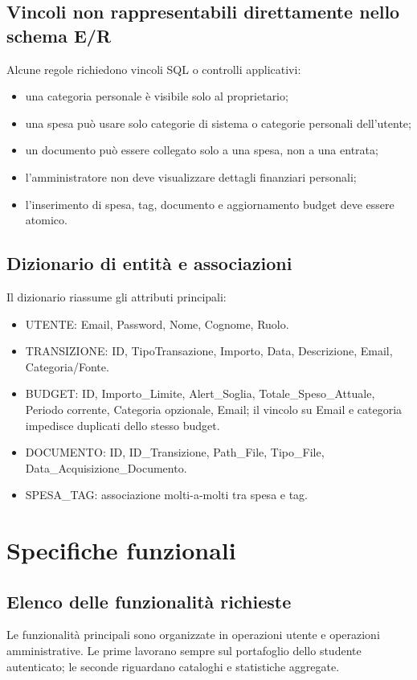 \documentclass[11pt,a4paper]{article}
\begin{document}
\subsection{Vincoli non rappresentabili direttamente nello schema E/R}
Alcune regole richiedono vincoli SQL o controlli applicativi:
\begin{itemize}
    \item una categoria personale è visibile solo al proprietario;
    \item una spesa può usare solo categorie di sistema o categorie personali dell'utente;
    \item un documento può essere collegato solo a una spesa, non a una entrata;
    \item l'amministratore non deve visualizzare dettagli finanziari personali;
    \item l'inserimento di spesa, tag, documento e aggiornamento budget deve essere atomico.
\end{itemize}

\subsection{Dizionario di entità e associazioni}
Il dizionario riassume gli attributi principali:
\begin{itemize}
    \item \textsc{UTENTE}: Email, Password, Nome, Cognome, Ruolo.
    \item \textsc{TRANSIZIONE}: ID, TipoTransazione, Importo, Data, Descrizione, Email, Categoria/Fonte.
    \item \textsc{BUDGET}: ID, Importo\_Limite, Alert\_Soglia, Totale\_Speso\_Attuale, Periodo corrente, Categoria opzionale, Email; il vincolo su Email e categoria impedisce duplicati dello stesso budget.
    \item \textsc{DOCUMENTO}: ID, ID\_Transizione, Path\_File, Tipo\_File, Data\_Acquisizione\_Documento.
    \item \textsc{SPESA\_TAG}: associazione molti-a-molti tra spesa e tag.
\end{itemize}

\section{Specifiche funzionali}
\subsection{Elenco delle funzionalità richieste}
Le funzionalità principali sono organizzate in operazioni utente e operazioni amministrative. Le prime lavorano sempre sul portafoglio dello studente autenticato; le seconde riguardano cataloghi e statistiche aggregate.
\end{document}
